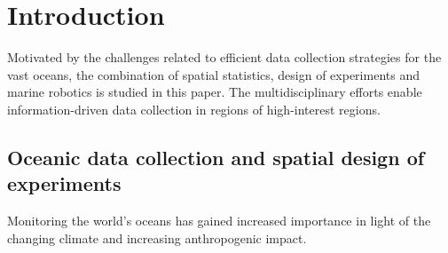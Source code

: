 \documentclass[aoas]{imsart}
\begin{document}
\section{Introduction}


Motivated by the challenges related to efficient data collection strategies for the vast oceans, the combination of spatial statistics, design of experiments and marine robotics is studied in this paper. The multidisciplinary efforts enable information-driven data collection in regions of high-interest regions.

\subsection{Oceanic data collection and spatial design of experiments}



Monitoring the world's oceans has gained increased importance in light of the changing climate and increasing anthropogenic impact. 
\end{document}
